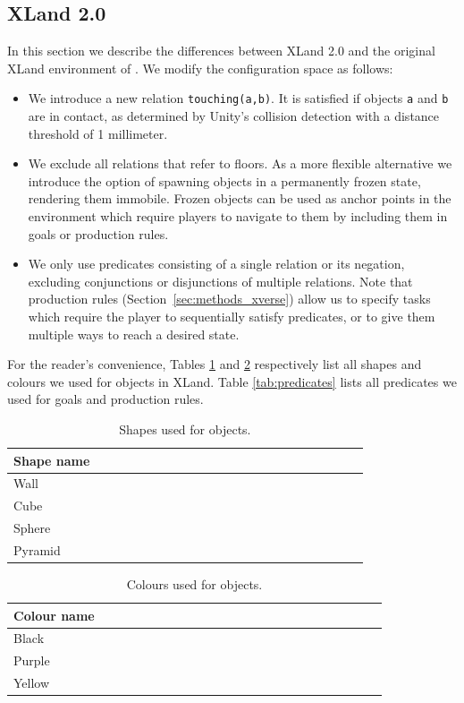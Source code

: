 \subsection{XLand 2.0}
\label{app:xland_changes}

In this section we describe the differences between XLand 2.0 and the original XLand environment of \cite{xland}. We modify the configuration space as follows:

\begin{itemize}
    \item We introduce a new relation \texttt{touching(a,b)}. It is satisfied if objects \texttt{a} and \texttt{b} are in contact, as determined by Unity's collision detection with a distance threshold of 1 millimeter.
    \item We exclude all relations that refer to floors. As a more flexible alternative we introduce the option of spawning objects in a permanently frozen state, rendering them immobile. Frozen objects can be used as anchor points in the environment which require players to navigate to them by including them in goals or production rules.
    \item We only use predicates consisting of a single relation or its negation, excluding conjunctions or disjunctions of multiple relations. Note that production rules (Section~\ref{sec:methods_xverse}) allow us to specify tasks which require the player to sequentially satisfy predicates, or to give them multiple ways to reach a desired state.
\end{itemize}

For the reader's convenience, Tables \ref{tab:objects} and \ref{tab:colors} respectively list all shapes and colours we used for objects in XLand. Table \ref{tab:predicates} lists all predicates we used for goals and production rules.

\begin{longtable}{|p{0.25\linewidth}|p{0.1\linewidth}p{0.52\linewidth}}
    \caption{Shapes used for objects.}
    \label{tab:objects}
    \\ \hline
      \textbf{Shape name}\\
      \hline
      Wall \\
      \hline
      Cube \\
      \hline
      Sphere \\
      \hline
      Pyramid \\
      \hline
\end{longtable}

\begin{longtable}{|p{0.25\linewidth}|p{0.1\linewidth}|p{0.52\linewidth}}
    \caption{Colours used for objects.}
    \label{tab:colors}
    \\ \hline
      \textbf{Colour name} \\
      \hline
      Black \\
      \hline
      Purple \\
      \hline
      Yellow \\
      \hline
\end{longtable}

